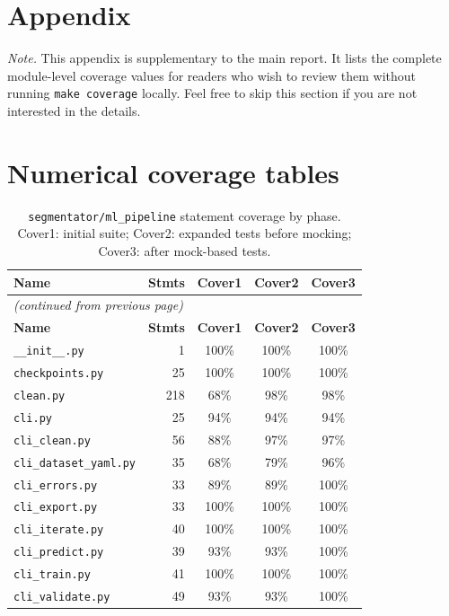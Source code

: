 \section*{Appendix}
\noindent\textit{Note.} This appendix is supplementary to the main report. It lists the complete module-level coverage values for readers who wish to review them without running \texttt{make coverage} locally. Feel free to skip this section if you are not interested in the details.

\section{Numerical coverage tables}
\label{app:coverage_tables}

{\scriptsize
\begin{longtable}{@{}l r c c c@{}}
\caption{\texttt{segmentator/ml\_pipeline} statement coverage by phase. Cover1: initial suite; Cover2: expanded tests before mocking; Cover3: after mock-based tests.}
\label{tab:coverage_ml_pipeline} \\
\hline
\textbf{Name} & \textbf{Stmts} & \textbf{Cover1} & \textbf{Cover2} & \textbf{Cover3} \\
\hline
\endfirsthead
\multicolumn{5}{l}{\textit{(continued from previous page)}} \\
\hline
\textbf{Name} & \textbf{Stmts} & \textbf{Cover1} & \textbf{Cover2} & \textbf{Cover3} \\
\hline
\endhead
\hline
\endfoot
\texttt{\_\_init\_\_.py} & 1 & 100\% & 100\% & 100\% \\
\texttt{checkpoints.py} & 25 & 100\% & 100\% & 100\% \\
\texttt{clean.py} & 218 & 68\% & 98\% & 98\% \\
\texttt{cli.py} & 25 & 94\% & 94\% & 94\% \\
\texttt{cli\_clean.py} & 56 & 88\% & 97\% & 97\% \\
\texttt{cli\_dataset\_yaml.py} & 35 & 68\% & 79\% & 96\% \\
\texttt{cli\_errors.py} & 33 & 89\% & 89\% & 100\% \\
\texttt{cli\_export.py} & 33 & 100\% & 100\% & 100\% \\
\texttt{cli\_iterate.py} & 40 & 100\% & 100\% & 100\% \\
\texttt{cli\_predict.py} & 39 & 93\% & 93\% & 100\% \\
\texttt{cli\_train.py} & 41 & 100\% & 100\% & 100\% \\
\texttt{cli\_validate.py} & 49 & 93\% & 93\% & 100\% \\

\end{longtable}}
